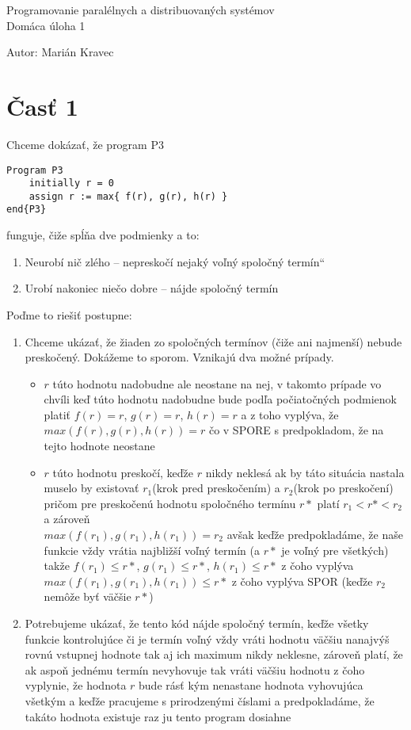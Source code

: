 \documentclass[a4paper]{article}
\begin{document}
 
	
\pagestyle{plain}

\begin{center}
	\sc\large
	Programovanie paralélnych a distribuovaných systémov\\
	Domáca úloha 1 
\end{center}

Autor: Marián Kravec

\section{Časť 1}

Chceme dokázať, že program P3 
\begin{lstlisting}
Program P3
	initially r = 0
	assign r := max{ f(r), g(r), h(r) }
end{P3}
\end{lstlisting}

funguje, čiže spĺňa dve podmienky a to:

\begin{enumerate}
	\item Neurobí nič zlého – nepreskočí nejaký voľný spoločný termín“
	\item Urobí nakoniec niečo dobre – nájde spoločný termín
\end{enumerate}

Poďme to riešiť postupne:

\begin{enumerate}
	\item Chceme ukázať, že žiaden zo spoločných termínov (čiže ani najmenší) nebude preskočený. Dokážeme to sporom. Vznikajú dva možné prípady.
	\begin{itemize}
		\item $r$ túto hodnotu nadobudne ale neostane na nej, v takomto prípade vo chvíli keď túto hodnotu nadobudne bude podľa počiatočných podmienok platiť $f(r)=r$, $g(r)=r$, $h(r)=r$ a z toho vyplýva, že $max(f(r), g(r), h(r))=r$ čo v SPORE s predpokladom, že na tejto hodnote neostane
		\item $r$ túto hodnotu preskočí, keďže $r$ nikdy neklesá ak by táto situácia nastala muselo by existovať $r_1$(krok pred preskočením) a $r_2$(krok po preskočení) pričom pre preskočenú hodnotu spoločného termínu $r*$ platí $r_1 < r* < r_2$ a zároveň
		\\$max(f(r_1), g(r_1), h(r_1))=r_2$ avšak keďže predpokladáme, že naše funkcie vždy vrátia najbližší voľný termín (a $r*$ je voľný pre všetkých) takže $f(r_1) \leq r*$, $g(r_1) \leq r*$, $h(r_1) \leq r*$ z čoho vyplýva $max(f(r_1), g(r_1), h(r_1)) \leq r*$ z čoho vyplýva SPOR (keďže $r_2$ nemôže byť väčšie $r*$)
	\end{itemize}
	\item Potrebujeme ukázať, že tento kód nájde spoločný termín, keďže všetky funkcie kontrolujúce či je termín voľný vždy vráti hodnotu väčšiu nanajvýš rovnú vstupnej hodnote tak aj ich maximum nikdy neklesne, zároveň platí, že ak aspoň jednému termín nevyhovuje tak vráti väčšiu hodnotu z čoho vyplynie, že hodnota $r$ bude rásť kým nenastane hodnota vyhovujúca všetkým a keďže pracujeme s prirodzenými číslami a predpokladáme, že takáto hodnota existuje raz ju tento program dosiahne
\end{enumerate}
\end{document}
